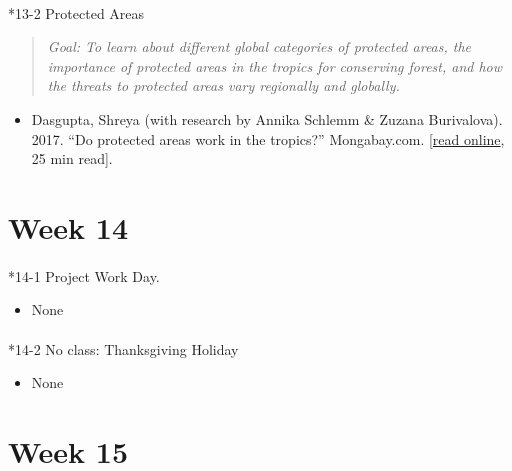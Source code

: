 \documentclass[
  10pt,
  letterpaper,
  oneside,
  open=any]{scrbook}
\makeatletter
\let\oldparagraph\paragraph
\renewcommand{\paragraph}{
    \@ifstar
      \xxxParagraphStar
      \xxxParagraphNoStar
  }
\newcommand{\xxxParagraphStar}[1]{\oldparagraph*{#1}\mbox{}}
\newcommand{\xxxParagraphNoStar}[1]{\oldparagraph{#1}\mbox{}}
\providecommand{\tightlist}{%
  \setlength{\itemsep}{0pt}\setlength{\parskip}{0pt}}
\makeatother
\begin{document}
\paragraph*{13-2 Protected Areas}\label{protected-areas}

\begin{quote}
\emph{Goal: To learn about different global categories of protected
areas, the importance of protected areas in the tropics for conserving
forest, and how the threats to protected areas vary regionally and
globally.}
\end{quote}

\begin{itemize}
\tightlist
\item
  Dasgupta, Shreya (with research by Annika Schlemm \& Zuzana
  Burivalova). 2017. ``Do protected areas work in the tropics?''
  Mongabay.com.
  {[}\href{https://news.mongabay.com/2017/12/do-protected-areas-work-in-the-tropics/}{read
  online}, 25 min read{]}.
\end{itemize}

\section*{Week 14}\label{week-14}


\paragraph*{14-1 Project Work Day.}\label{project-work-day.}

\begin{itemize}
\tightlist
\item
  None
\end{itemize}

\paragraph*{14-2 No class: Thanksgiving
Holiday}\label{no-class-thanksgiving-holiday}

\begin{itemize}
\tightlist
\item
  None
\end{itemize}

\section*{Week 15}\label{week-15}
\end{document}
